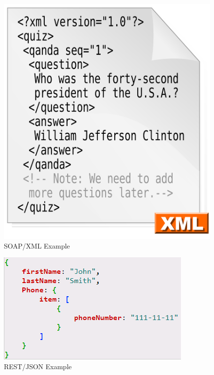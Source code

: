 \begin{figure}[!ht]
  \centering\includegraphics[width=\columnwidth]{images/xml-example.png}
  \caption{SOAP/XML Example}\label{f:xml-example}
\end{figure}

\begin{figure}[!ht]
  \centering\includegraphics[width=\columnwidth]{images/json-rest-example.png}
  \caption{REST/JSON Example}\label{f:rest-example}
\end{figure}


